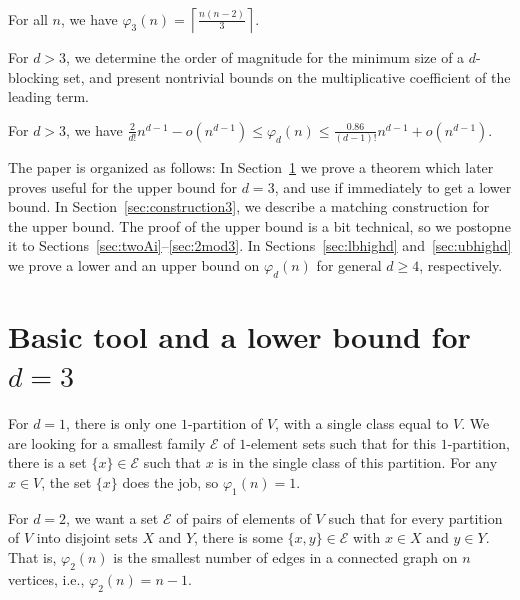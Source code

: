 \documentclass[11pt,a4paper]{article}
\begin{document}
\begin{theorem}\label{thm:main3}
For all $n$, we have $\varphi_3(n)=\left\lceil \frac{n(n-2)}{3} \right\rceil$.
\end{theorem}

For $d>3$, we determine the order of magnitude for the minimum size of a $d$-blocking set, and present nontrivial bounds on the multiplicative coefficient of the leading term.

\begin{theorem}
    For $d>3$, we have $\frac{2 }{d!}n^{d-1} -o(n^{d-1}) \leq \varphi_d(n) \leq \frac{0.86}{(d-1)!}n^{d-1}+o(n^{d-1}).$
\end{theorem}

The paper is organized as follows: In Section~\ref{sec:basictool} we prove a theorem which later proves useful for the upper bound for $d=3$, and use if immediately to get a lower bound. In Section~\ref{sec:construction3}, we describe a matching construction for the upper bound. The proof of the upper bound is a bit  technical, so we postopne it to Sections~\ref{sec:twoAi}--\ref{sec:2mod3}. In Sections~\ref{sec:lbhighd} and~\ref{sec:ubhighd} we prove a lower and an upper bound on $\varphi_d(n)$ for general $d\geq 4$, respectively.







\section{Basic tool and a lower bound for \texorpdfstring{$d=3$}{}}\label{sec:basictool}

For $d=1$, there is only one $1$-partition of $V$, with a single class equal to $V$. We are looking for a smallest family $\mathcal{E}$ of $1$-element sets such that for this $1$-partition, there is a set $\{x\}\in \mathcal{E}$ such that $x$ is in the single class of this partition. For any $x\in V$, the set $\{x\}$ does the job, so $\varphi_1(n)=1$.

For $d=2$, we want a set $\mathcal{E}$ of pairs of elements of $V$ such that for every partition of $V$ into disjoint sets $X$ and $Y$, there is some $\{x,y\}\in\mathcal{E}$ with $x\in X$ and $y\in Y$. That is, $\varphi_2(n)$ is the smallest number of edges in a connected graph on $n$ vertices, i.e., $\varphi_2(n)=n-1$.
\end{document}
